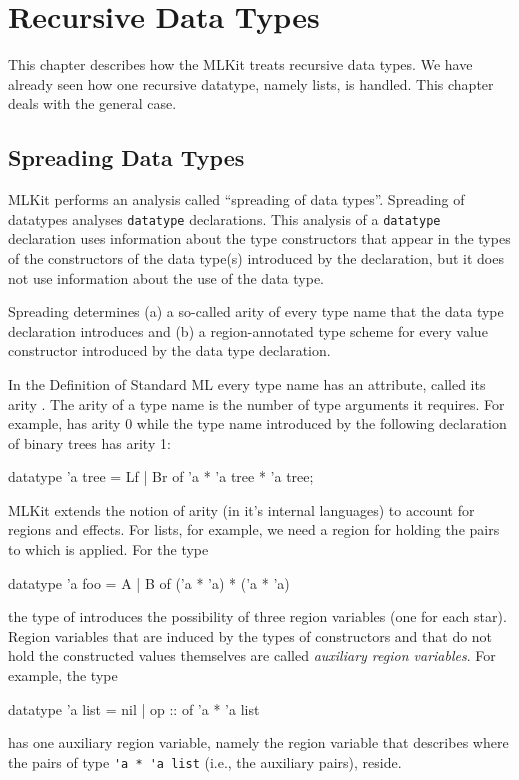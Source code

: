 \documentclass[12pt]{book}
\begin{document}
\chapter{Recursive Data Types}
\label{datatypes.sec}
This chapter describes how the MLKit treats recursive data types. We have
already seen how one recursive datatype, namely lists, is handled. This chapter
deals with the general case.

\section{Spreading Data Types}

MLKit performs an analysis called
%
%
%
``spreading of data types''.  Spreading of datatypes analyses
\lstinline{datatype} declarations.  This analysis of a \lstinline{datatype}
declaration uses information about the type constructors that appear in the
types of the constructors of the data type(s) introduced by the declaration, but
it does not use information about the use of the data type.

Spreading determines (a) a so-called
%
%
%
arity of every type name that the data type declaration introduces and (b) a
region-annotated type scheme for every value constructor introduced by the data
type declaration.

In the Definition of Standard ML every type name has an attribute, called its
arity \cite[page 15]{mthm97}. The arity of a type name is the number of type
arguments it requires. For example,  has arity 0 while the type name
introduced by the following declaration of binary trees has arity 1:
%
%
%
%
%
%
%
\begin{smlcode}
  datatype 'a tree = Lf | Br of 'a * 'a tree * 'a tree;
\end{smlcode}

MLKit extends the notion of arity (in it's internal languages) to account
for regions and effects. For lists, for example, we need a region for holding
the pairs to which \kw{::} is applied. For the type
\begin{smlcode}
  datatype 'a foo = A | B of ('a * 'a) * ('a * 'a)
\end{smlcode}
the type of  introduces the possibility of three region variables (one for
each star). Region variables that are induced by the types of constructors and
that do not hold the constructed values themselves are called
%
%
%
{\em auxiliary region variables}. For example, the  type
\begin{smlcode}
  datatype 'a list = nil | op :: of 'a * 'a list
\end{smlcode}
has one auxiliary region variable, namely the region variable that describes
where the pairs of type \lstinline{'a * 'a list} (i.e., the auxiliary
%
%
%
pairs), reside.
\end{document}
